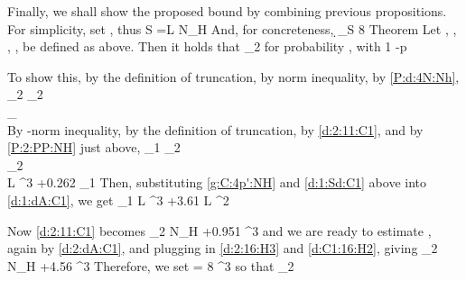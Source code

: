 Finally, we shall show the proposed bound by combining previous propositions.
For simplicity, set , thus
%
 {
S
=L \log N_H 
}
%
And, for concreteness,
%
 {
\d_S
\leq {} {8} 
}
%
\Result
{Theorem}
{
Let , , , ,  be defined as above.
Then it holds that
%
 {
 _2
\eqsim {}  
}
%
for probability , with
%
 {
1 -p
\eqsim {}  
}
}

To show this, by the definition of truncation, by  norm inequality, by \eqref {P:d:4N:Nh},
%
 {
 _2
\leq {} _2 \\
%
\leq {}  _\infty \\
%
  
}
%
By -norm inequality, by the definition of truncation, by \eqref {d:2:11:C1}, and by \eqref {P:2:PP:NH} just above,
%
 {
 _1
\leq {}  _2 \\
%
\leq {}  _2 \\
%
 L ^3
+0.262  _1 
}
%
Then, substituting \eqref {g:C:4p':NH} and \eqref {d:1:Sd:C1} above into \eqref {d:1:dA:C1}, we get
 {
 _1
%
 L ^3 +3.61 L ^2 
}

Now \eqref {d:2:11:C1} becomes
%
 {
 _2
%
  \log N_H +0.951  ^3 
}
and we are ready to estimate , again by \eqref {d:2:dA:C1}, and plugging in \eqref {d:2:16:H3} and \eqref {d:C1:16:H2}, giving
 {
 _2
  \log N_H +4.56  ^3 
}
Therefore, we set
 {
\chi
= 8  ^3 
}
so that
 {
 _2
\leq \chi 
}

